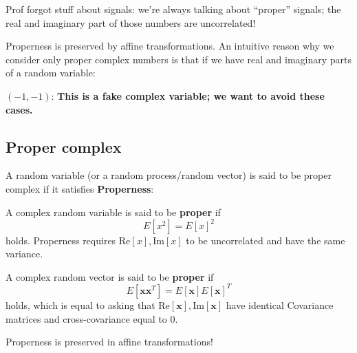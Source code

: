 \documentclass[a4paper, 12pt]{book}
\begin{document}
Prof forgot stuff about signals: we're always talking about ``proper'' signals; the real and imaginary part of those numbers are uncorrelated!

Properness is preserved by affine transformations. An intuitive reason why we consider only proper complex numbers is that if we have real and imaginary parts of a random variable:

\begin{center}
\end{center}

$(-1, -1)$: \textbf{This is a fake complex variable; we want to avoid these cases.}

\subsection{Proper complex}

A random variable (or a random process/random vector) is said to be proper complex if it satisfies \textbf{Properness}:

\begin{definition}[Properness]
    A complex random variable is said to be \textbf{proper} if
    \[ E[x^2] = E[x]^2 \]
    holds. Properness requires $\mathrm{Re}[x], \mathrm{Im}[x]$ to be uncorrelated and have the same variance.

    A complex random vector is said to be \textbf{proper} if
    \[ E[\bm{x}\bm{x}^T] = E[\bm{x}]E[\bm{x}]^T \]
    holds, which is equal to asking that $\mathrm{Re}[\bm{x}], \mathrm{Im}[\bm{x}]$ have identical Covariance matrices and cross-covariance equal to 0.
\end{definition}

\begin{remark}
    Properness is preserved in affine transformations!
\end{remark}
\end{document}
